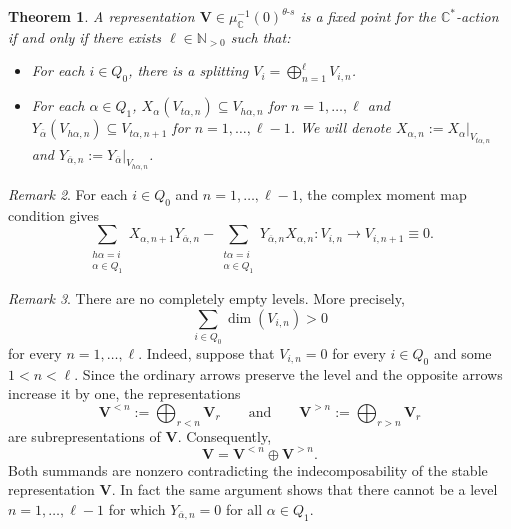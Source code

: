 \documentclass{amsart}
\theoremstyle{plain}
\newtheorem{theorem}{Theorem}[section]
\numberwithin{equation}{section}
\theoremstyle{definition}
\theoremstyle{remark}
\newtheorem{remark}[theorem]{Remark}
\begin{document}
	\begin{theorem}\label{characterizationFixedPoints}
		A representation $\mathbf{V}\in \mu^{-1}_{\mathbb{C}}(0)^{\theta\text{-}s}$ is a fixed point for the $\mathbb{C}^*$-action if and only if there exists $\ell\in \mathbb{N}_{>0}$ such that: 
		\begin{itemize}
			\item For each $i\in Q_0$, there is a splitting $V_i=\bigoplus_{n=1}^\ell V_{i,n}$.
			\item For each $\alpha\in Q_1$, $X_\alpha(V_{t\alpha,n})\subseteq V_{h\alpha,n}$ for $n=1,\ldots,\ell$ and $Y_{\overline{\alpha}}(V_{h\alpha,n})\subseteq V_{t\alpha,n+1}$ for $n=1,\ldots,\ell-1$. We will denote $X_{\alpha,n}:=X_{\alpha}|_{V_{t\alpha,n}}$ and $Y_{\overline{\alpha},n}:=Y_{\overline{\alpha}}|_{V_{h\alpha,n}} $.
		\end{itemize}
	\end{theorem}
	\begin{remark}\label{complexMomentMapConditionOnChains}
		For each $i\in Q_0$ and $n=1,\ldots,\ell-1$, the complex moment map condition gives $$\sum_{\substack{h\alpha=i\\\alpha\in Q_1}}X_{\alpha,n+1}Y_{\overline{\alpha},n}-\sum_{\substack{t\alpha=i\\\alpha\in Q_1}}Y_{\overline{\alpha},n}X_{\alpha,n}:V_{i,n}\to V_{i,n+1}\equiv 0.$$
	\end{remark}
	\begin{remark}\label{noEmptyLevels}
		There are no completely empty
		levels. More precisely,
		$$
		\sum_{i\in Q_0}\dim(V_{i,n})>0
		$$
		for every $n=1,\ldots,\ell$. Indeed, suppose that $V_{i,n}=0$ for every $i\in Q_0$ and some
		$1<n<\ell$. Since the ordinary arrows preserve the level and the opposite
		arrows increase it by one, the representations
		\[
		\mathbf V^{<n}
		:=
		\bigoplus_{r<n}\mathbf V_r
		\qquad\text{and}\qquad
		\mathbf V^{>n}
		:=
		\bigoplus_{r>n}\mathbf V_r
		\]
		are subrepresentations of $\mathbf V$. Consequently,
		\[
		\mathbf V=\mathbf V^{<n}\oplus\mathbf V^{>n}.
		\]
		Both summands are nonzero contradicting the indecomposability of the stable representation
		$\mathbf V$. In fact the same argument shows that there cannot be a level $n=1,\ldots,\ell-1$ for which $Y_{\overline{\alpha},n}=0 $ for all $\alpha\in Q_1$. 
	\end{remark}
\end{document}

